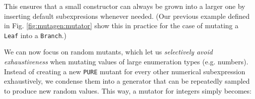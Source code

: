 \documentclass[sigconf,review,anonymous]{acmart}
\newcommand\mydots{\hbox to 0.75em{.\hss.\hss.}}
\newcommand{\mutagen}{\textsc{Mutagen}\xspace}
\begin{document}
\noindent This ensures that a small constructor can always be grown into a
larger one by inserting default subexpresions whenever needed.
%
(Our previous example defined in Fig. \ref{fig:mutagen:mutator} show this in
practice for the case of mutating a \texttt{Leaf} into a \texttt{Branch}.)  








%
We can now focus on random mutants, which let us \emph{selectively avoid
exhaustiveness} when mutating values of large enumeration types (e.g. numbers).
%
%
Instead of creating a new \texttt{PURE} mutant for every other numerical
subexpression exhaustively, we condense them into a generator that can be
repeatedly sampled to produce new random values.   
%
%
This way, a mutator for integers simply becomes:
\end{document}
